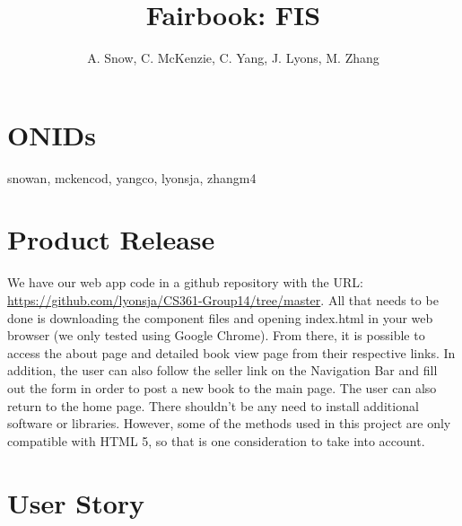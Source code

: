 \documentclass[12pt]{article}
\title{Fairbook: FIS}
\author{A. Snow, C. McKenzie, C. Yang, J. Lyons, M. Zhang}
\begin{document}
	\maketitle


	\tableofcontents
	\section{ONIDs}
		snowan, mckencod, yangco, lyonsja, zhangm4



	\section{Product Release}
	We have our web app code in a github repository with the URL: \url{https://github.com/lyonsja/CS361-Group14/tree/master}.
	All that needs to be done is downloading the component files and opening index.html in your web browser (we only tested using Google Chrome). 
	From there, it is possible to access the about page and detailed book view page from their respective links. In addition, the user can also follow the seller link on the
	Navigation Bar and fill out the form in order to post a new book to the main page.
	The user can also return to the home page. 
	There shouldn’t be any need to install additional software or libraries. However, some of the methods used in this project
	are only compatible with HTML 5, so that is one consideration to take into account.

	\section{User Story}
\end{document}
